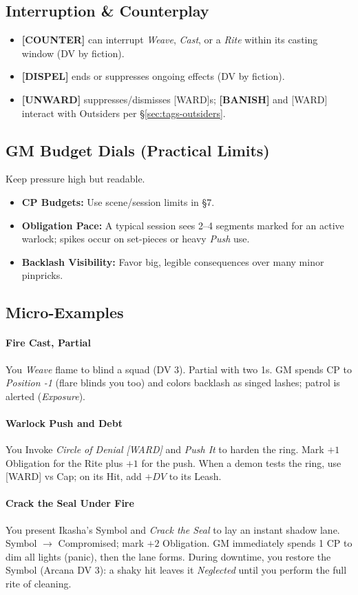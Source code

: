 \subsection{Interruption \& Counterplay}
\begin{itemize}
  \item \textbf{[COUNTER]} can interrupt \emph{Weave}, \emph{Cast}, or a \emph{Rite} within its casting window (DV by fiction).
  \item \textbf{[DISPEL]} ends or suppresses ongoing effects (DV by fiction).
  \item \textbf{[UNWARD]} suppresses/dismisses [WARD]s; \textbf{[BANISH]} and [WARD] interact with Outsiders per \S\ref{sec:tags-outsiders}.
\end{itemize}

\subsection{GM Budget Dials (Practical Limits)}
Keep pressure high but readable.
\begin{itemize}
  \item \textbf{CP Budgets:} Use scene/session limits in \S7.
  \item \textbf{Obligation Pace:} A typical session sees 2--4 segments marked for an active warlock; spikes occur on set-pieces or heavy \emph{Push} use.
  \item \textbf{Backlash Visibility:} Favor big, legible consequences over many minor pinpricks.
\end{itemize}

\subsection{Micro-Examples}
\paragraph{Fire Cast, Partial}
You \emph{Weave} flame to blind a squad (DV 3). Partial with two 1s. GM spends CP to \emph{Position -1} (flare blinds you too) and colors backlash as singed lashes; patrol is alerted (\emph{Exposure}).

\paragraph{Warlock Push and Debt}
You Invoke \emph{Circle of Denial [WARD]} and \emph{Push It} to harden the ring. Mark $+1$ Obligation for the Rite plus $+1$ for the push. When a demon tests the ring, use [WARD] vs Cap; on its Hit, add $+DV$ to its Leash.

\paragraph{Crack the Seal Under Fire}
You present Ikasha’s Symbol and \emph{Crack the Seal} to lay an instant shadow lane. Symbol $\rightarrow$ Compromised; mark $+2$ Obligation. GM immediately spends 1 CP to dim all lights (panic), then the lane forms. During downtime, you restore the Symbol (Arcana DV 3): a shaky hit leaves it \emph{Neglected} until you perform the full rite of cleaning.
